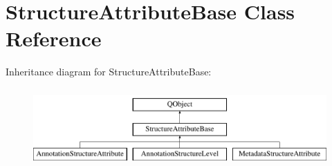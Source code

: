 \hypertarget{class_structure_attribute_base}{}\section{Structure\+Attribute\+Base Class Reference}
\label{class_structure_attribute_base}
Inheritance diagram for Structure\+Attribute\+Base\+:\begin{figure}[H]
\begin{center}
\leavevmode
\includegraphics[height=3.000000cm]{class_structure_attribute_base}
\end{center}
\end{figure}
